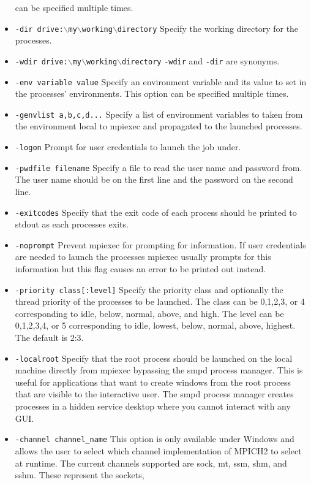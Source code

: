 \documentclass[dvipdfm,11pt]{article}
\begin{document}
\begin{itemize}
can be specified multiple times.
\item \texttt{-dir drive:$\backslash$my$\backslash$working$\backslash$directory}
Specify the working directory for the processes.
\item \texttt{-wdir drive:$\backslash$my$\backslash$working$\backslash$directory}
\texttt{-wdir} and \texttt{-dir} are synonyms.
\item \texttt{-env variable value}
Specify an environment variable and its value to set in the processes' environments.
This option can be specified multiple times.
\item \texttt{-genvlist a,b,c,d...}
Specify a list of environment variables to taken from the environment local to mpiexec and propagated to the launched processes.
\item \texttt{-logon}
Prompt for user credentials to launch the job under.
\item \texttt{-pwdfile filename}
Specify a file to read the user name and password from.  The user name should be
on the first line and the password on the second line.
\item \texttt{-exitcodes}
Specify that the exit code of each process should be printed to stdout as each
processes exits.
\item \texttt{-noprompt}
Prevent mpiexec for prompting for information.  If user credentials are needed
to launch the processes mpiexec usually prompts for this information but this
flag causes an error to be printed out instead.
\item \texttt{-priority class[:level]}
Specify the priority class and optionally the thread priority of the processes
to be launched.  The class can be 0,1,2,3, or 4 corresponding to idle, below,
normal, above, and high.  The level can be 0,1,2,3,4, or 5 corresponding to
idle, lowest, below, normal, above, highest.  The default is 2:3.
\item \texttt{-localroot}
Specify that the root process should be launched on the local machine directly
from mpiexec bypassing the smpd process manager.  This is useful for applications
that want to create windows from the root process that are visible to the interactive
user.  The smpd process manager creates processes in a hidden service desktop
where you cannot interact with any GUI.
\item \texttt{-channel channel\_name}
This option is only available under Windows and allows the user to select which
channel implementation of MPICH2 to select at runtime.  The current channels
supported are sock, mt, ssm, shm, and sshm.  These represent the sockets, 

\end{itemize}
\end{document}
